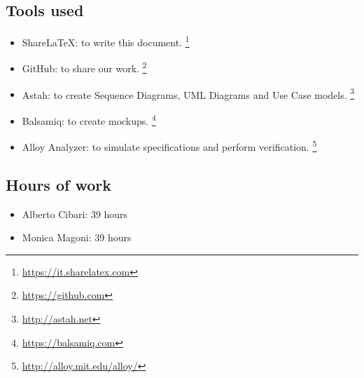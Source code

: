 \subsection*{Tools used}
    \begin{itemize}
    \item ShareLaTeX: to write this document. \footnote{\url{https://it.sharelatex.com}}
    \item GitHub: to share our work. \footnote{\url{https://github.com}} 
    \item Astah: to create Sequence Diagrams, UML Diagrams and Use Case models. \footnote{\url{http://astah.net}}
    \item Balsamiq: to create mockups. \footnote{\url{https://balsamiq.com}}
    \item Alloy Analyzer: to simulate specifications and perform verification. \footnote{\url{http://alloy.mit.edu/alloy/}}
    \end{itemize}

\subsection*{Hours of work}
    \begin{itemize}
    \item Alberto Cibari: 39 hours
    \item Monica Magoni: 39 hours
\end{itemize}
